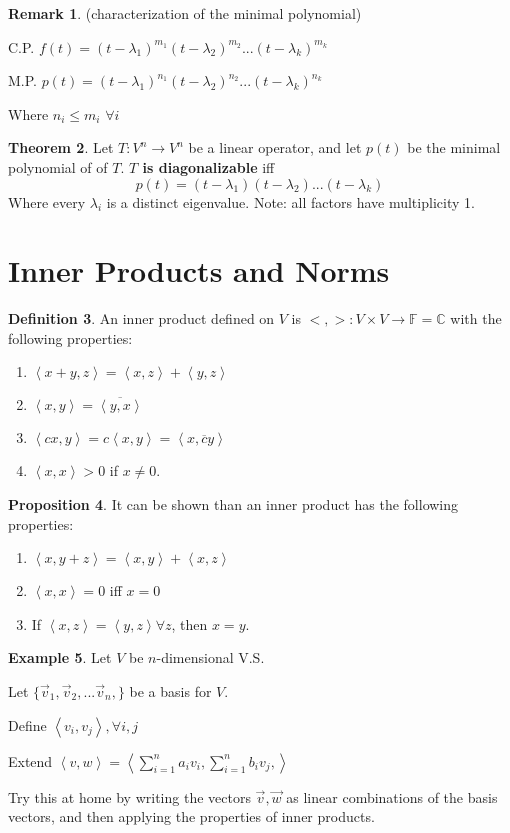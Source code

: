 \documentclass[a5paper]{article}
\theoremstyle{definition}%
\newtheorem{theorem}{Theorem}
\numberwithin{theorem}{section} %
\newtheorem{definition}[theorem]{Definition}
\newtheorem{example}[theorem]{Example}
\newtheorem{proposition}[theorem]{Proposition}
\newtheorem{remark}[theorem]{Remark}
\newcommand{\C}{\mathbb{C}}
\newcommand{\F}{\mathbb{F}}
\newcommand*\conj[1]{\overline{#1}}
\newcommand{\inner}[1]{\left< #1 \right>}
\begin{document}
\begin{remark}
(characterization of the minimal polynomial)

C.P.  $f(t)=(t-\lambda_1)^{m_1}(t-\lambda_2)^{m_2}...(t-\lambda_k)^{m_k}$

M.P.  $p(t)=(t-\lambda_1)^{n_1}(t-\lambda_2)^{n_2}...(t-\lambda_k)^{n_k}$

Where $n_i \leq m_i $ $\forall i$
\end{remark}

\begin{theorem}
Let $T:V^n \to V^n$ be a linear operator, and let $p(t)$ be the minimal polynomial of of $T$. \textbf{$T$ is diagonalizable} iff $$p(t)=(t-\lambda_1)(t-\lambda_2)...(t-\lambda_k)$$ Where every $\lambda_i$ is a distinct eigenvalue. Note: all factors have multiplicity 1.
\end{theorem}

\section{Inner Products and Norms}

\begin{definition}
An inner product defined on $V$ is $<,>:V \times	V \to \F = \C$ with the following properties:
\begin{enumerate}
\item $\inner{x+y,z} = \inner{x,z} + \inner{y,z}$
\item $\inner{x,y} = \conj{\inner{y,x}}$
\item $\inner{cx,y} = c\inner{x,y} = \inner{x,\conj{c}y}$
\item $\inner{x,x} > 0$ if $x \neq 0.$
\end{enumerate}
\end{definition}

\begin{proposition}
It can be shown than an inner product has the following properties:
\begin{enumerate}
\item $\inner{x,y+z} = \inner{x,y}+\inner{x,z}$
\item $\inner{x,x}=0$ iff $x=0$
\item If $\inner{x,z} = \inner{y,z} \forall z$, then $x=y$.
\end{enumerate}
\end{proposition}

\begin{example}
Let $V$ be $n$-dimensional V.S. 

Let $\{\vec{v}_1, \vec{v}_2, ... \vec{v}_n,\}$ be a basis for $V$. 

Define $\inner{v_i,v_j}, \forall i,j  $

Extend $\inner{v,w}=\inner{\sum_{i=1}^na_iv_i, \sum_{i=1}^nb_iv_j,}$

Try this at home by writing the vectors $\vec{v}, \vec{w}$ as linear combinations of the basis vectors, and then applying the properties of inner products. 
\end{example}
\end{document}

